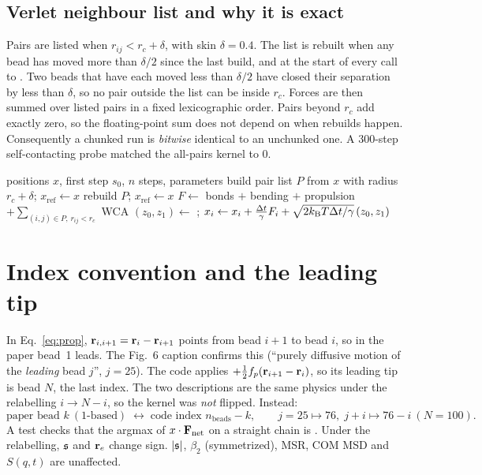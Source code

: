 \documentclass[11pt]{article}
\begin{document}
\subsection{Verlet neighbour list and why it is exact}
Pairs are listed when $r_{ij}<r_c+\delta$, with skin $\delta=0.4$. The list is rebuilt when any bead has moved more than $\delta/2$ since the last
build, and at the start of every call to . Two beads that have each moved less than $\delta/2$ have closed their separation by
less than $\delta$, so no pair outside the list can be inside $r_c$. Forces are then summed over listed pairs in a fixed lexicographic order. Pairs beyond
$r_c$ add exactly zero, so the floating-point sum does not depend on when rebuilds happen. Consequently a chunked run is \emph{bitwise} identical to an
unchunked one. A 300-step self-contacting probe matched the all-pairs kernel to 0.
\begin{algorithm}[H]
\caption{ (production path, $=0$)}
\begin{algorithmic}[1]
\Require positions $x$, first step $s_0$, $n$ steps, parameters
\State build pair list $P$ from $x$ with radius $r_c+\delta$; $x_\mathrm{ref}\gets x$
   rebuild $P$; $x_\mathrm{ref}\gets x$ \EndIf
  \State $F\gets$ bonds $+$ bending $+$ propulsion $+\sum_{(i,j)\in P,\,r_{ij}<r_c}$ WCA
   $(z_0,z_1)\gets$ ;\;
     $x_i\gets x_i+\frac{\Delta t}{\gamma}F_i+\sqrt{2k_{\mathrm{B}}T\Delta t/\gamma}\,(z_0,z_1)$ \EndFor
\EndFor
\end{algorithmic}
\end{algorithm}

\section{Index convention and the leading tip}\label{sec:index}
In Eq.~\eqref{eq:prop}, $\mathbf{r}_{i,i+1}=\mathbf{r}_i-\mathbf{r}_{i+1}$ points from bead $i+1$ to bead $i$, so in the paper bead~1 leads.
The Fig.~6 caption confirms this (``purely diffusive motion of the \emph{leading} bead $j$'', $j=25$).
The code applies $+\frac12f_p(\mathbf{r}_{i+1}-\mathbf{r}_i)$, so its leading tip is bead $N$, the last index.
The two descriptions are the same physics under the relabelling $i\to N-i$, so the kernel was \emph{not} flipped. Instead:
\begin{equation}
\text{paper bead }k\ (1\text{-based}) \;\longleftrightarrow\; \text{code index } n_\mathrm{beads}-k,\qquad j=25\mapsto76,\; j+i\mapsto76-i\ (N=100).
\end{equation}
A test checks that the argmax of $x\cdot\mathbf{F}_\mathrm{net}$ on a straight chain is .
Under the relabelling, $\mathfrak{s}$ and $\mathbf{r}_e$ change sign. $|\mathfrak{s}|$, $\beta_2$ (symmetrized), MSR, COM MSD and $S(q,t)$ are unaffected.
\end{document}
